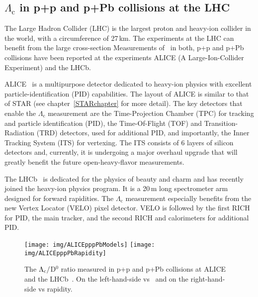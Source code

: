 \subsection{$\Lambda_\mathrm{c}$ in p+p and p+Pb collisions at the LHC\label{LcInPPandPPb}}
The Large Hadron Collider (LHC) is the largest proton and heavy-ion collider in the world, with a circumference of 27$\,$km. The experiments at the LHC can benefit from the large cross-section  Measurements of \Lambdac\ in both, p+p and p+Pb collisions have been reported at  the experiments ALICE (A Large-Ion-Collider Experiment) and the LHCb. 

ALICE~\cite{ALICE} is a multipurpose detector dedicated to heavy-ion physics with excellent particle-identification (PID) capabilities. The layout of ALICE is similar to that of STAR (see chapter~\ref{STARchapter} for more detail). The key detectors that enable the $\Lambda_\mathrm{c}$ measurement are the Time-Projection Chamber (TPC) for tracking and particle identification (PID), the Time-Of-Flight (TOF) and Transition-Radiation (TRD) detectors, used for additional PID, and importantly, the Inner Tracking System (ITS) for vertexing. The ITS consists of 6 layers of silicon detectors and, currently, it is undergoing a major overhaul upgrade that will greatly benefit the future open-heavy-flavor measurements.

The LHCb~\cite{LHCb} is dedicated for the physics of beauty and charm and has recently joined the heavy-ion physics program. It is a 20$\,$m long spectrometer arm designed for forward rapidities. The $\Lambda_\mathrm{c}$ measurement especially benefits from the new Vertex Locator (VELO) \cite{VELO} pixel detector. VELO is followed by the first RICH for PID, the main tracker, and the second RICH and calorimeters for additional PID.

\begin{figure}[!htb]
\centering
\texttt{[image: img/ALICEpppPbModels]}
\texttt{[image: img/ALICEpppPbRapidity]}
\caption{The ${\Lambda_\text{c}}/$D$^0$ ratio measured in p+p and p+Pb collisions at ALICE~\cite{AliceLcPPPPb} and the LHCb~\cite{LHCbPrompt, LHCbPrivate}. On the left-hand-side vs \pt\ and on the right-hand-side vs rapidity.}
\label{fig:pppPb}
\end{figure}

